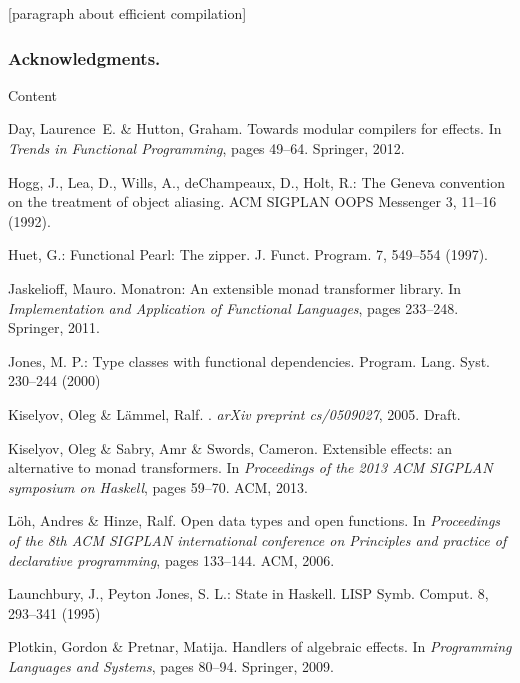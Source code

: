 \documentclass[runningheads,a4paper]{llncs}
\newcommand{\todo}[1]{[{\color{blue}#1}]}
\begin{document}
\todo{paragraph about efficient compilation}

\subsubsection*{Acknowledgments.} Content

\begin{thebibliography}{4}

Day, Laurence~E. \& Hutton, Graham.
\newblock Towards modular compilers for effects.
\newblock In \emph{Trends in Functional Programming}, pages 49--64. Springer,
  2012.

 Hogg, J., Lea, D., Wills, A., deChampeaux, D., Holt, R.: The Geneva convention on the treatment of object aliasing. ACM SIGPLAN OOPS Messenger 3, 11--16 (1992).

 Huet, G.: Functional Pearl: The zipper. J. Funct. Program. 7, 549--554 (1997).

Jaskelioff, Mauro.
\newblock Monatron: An extensible monad transformer library.
\newblock In \emph{Implementation and Application of Functional Languages},
  pages 233--248. Springer, 2011.
  
 Jones, M. P.: Type classes with functional dependencies. Program. Lang. Syst. 230--244 (2000)
  
  Kiselyov, Oleg \& L{\"a}mmel, Ralf.
  .
  \newblock \emph{arXiv preprint cs/0509027}, 2005.
  \newblock Draft.

Kiselyov, Oleg \& Sabry, Amr \& Swords, Cameron.
\newblock Extensible effects: an alternative to monad transformers.
\newblock In \emph{Proceedings of the 2013 ACM SIGPLAN symposium on Haskell},
  pages 59--70. ACM, 2013.

L{\"o}h, Andres \& Hinze, Ralf.
\newblock Open data types and open functions.
\newblock In \emph{Proceedings of the 8th ACM SIGPLAN international conference
  on Principles and practice of declarative programming}, pages 133--144. ACM,
  2006.
  
 Launchbury, J., Peyton Jones, S. L.: State in Haskell. LISP Symb. Comput. 8, 293--341 (1995)

Plotkin, Gordon \& Pretnar, Matija.
\newblock Handlers of algebraic effects.
\newblock In \emph{Programming Languages and Systems}, pages 80--94. Springer,
  2009.


\end{thebibliography}
\end{document}
